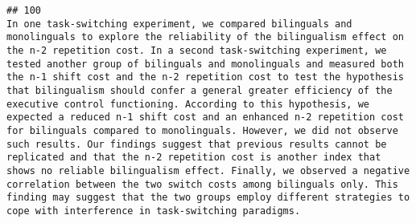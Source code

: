 \documentclass[
  english,
  man]{apa6}
\begin{document}
\begin{verbatim}
## 100                                                                                                                                                                                                                                                                                                                                                                                                                                                                                                                                                                                                                                                                                                                                                                                                                                                                                                                                                                                                                                                                                                                                                                                                                                                                                                                                                                                                                                                                                                                                                                                                                             In one task-switching experiment, we compared bilinguals and monolinguals to explore the reliability of the bilingualism effect on the n-2 repetition cost. In a second task-switching experiment, we tested another group of bilinguals and monolinguals and measured both the n-1 shift cost and the n-2 repetition cost to test the hypothesis that bilingualism should confer a general greater efficiency of the executive control functioning. According to this hypothesis, we expected a reduced n-1 shift cost and an enhanced n-2 repetition cost for bilinguals compared to monolinguals. However, we did not observe such results. Our findings suggest that previous results cannot be replicated and that the n-2 repetition cost is another index that shows no reliable bilingualism effect. Finally, we observed a negative correlation between the two switch costs among bilinguals only. This finding may suggest that the two groups employ different strategies to cope with interference in task-switching paradigms.

\end{verbatim}
\end{document}
